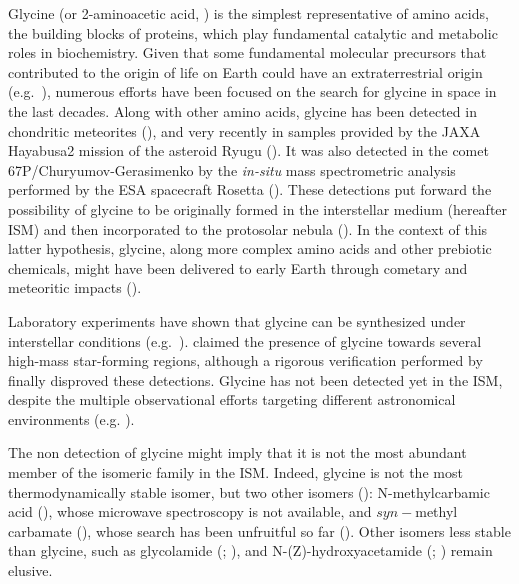 \documentclass[twocolumn]{aastex63}
\begin{document}
Glycine (or 2-aminoacetic acid, ) is the simplest representative of amino acids, the building blocks of proteins, which play fundamental catalytic and metabolic roles in biochemistry. Given that some fundamental molecular precursors that contributed to the origin of life on Earth could have an extraterrestrial origin (e.g.~\citealt{pearce2017}), numerous efforts have been focused on the search for glycine in space in the last decades. Along with other amino acids, glycine has been detected in chondritic meteorites (\citealt{cronin1983,burton2012}), and very recently in samples provided by the JAXA Hayabusa2 mission of the asteroid Ryugu (\citealt{Potiszil2023}). 
It was also detected in the comet 67P/Churyumov-Gerasimenko  by the {\it in-situ} mass spectrometric analysis performed by the ESA spacecraft Rosetta (\citealt{altwegg2016}). These detections put forward the possibility of glycine to be originally formed in the interstellar medium (hereafter ISM) and then incorporated to the protosolar nebula (\citealt{pizzarello2006}). 
In the context of this latter hypothesis, glycine, along more complex amino acids and other prebiotic chemicals, might have been delivered to early Earth through cometary and meteoritic impacts (\citealt{oro1961_comet,cronin1988,chyba1990,chyba1992,cooper2001,pasek2008,glavin2009,pearce2017,marty2017,obrien2018,rubin2019,rivilla2020a}).

Laboratory experiments have shown that glycine can be synthesized under interstellar conditions (e.g.~\citealt{munoz-caro2002,ioppolo2021}). \citet{kuan2003} claimed the presence of glycine towards several high-mass star-forming regions, although a rigorous verification performed by \citet{snyder2005} finally disproved these detections. Glycine has not been detected yet in the ISM, despite the multiple observational efforts targeting different astronomical environments (e.g. \citealt{combes1996,ceccarelli_structure_2000,snyder2005,jones2007,cunningham2007,jimenez-serra_spatial_2016,jimenez-serra2020}). 

The non detection of glycine might imply that it is not the most abundant member of the  isomeric family in the ISM. 
Indeed, glycine is not the most thermodynamically stable isomer, but two other isomers (\citealt{sanz-novo2019}): N-methylcarbamic acid (), whose microwave spectroscopy is not available, and $syn-$methyl carbamate (), whose search has been unfruitful so far (\citealt{demyk2004}). Other isomers less stable than glycine, such as glycolamide (; \citealt{sanz-novo2020,colzi2021}), and N-(Z)-hydroxyacetamide (; \citealt{sanz-novo2022b}) remain elusive.
\end{document}
